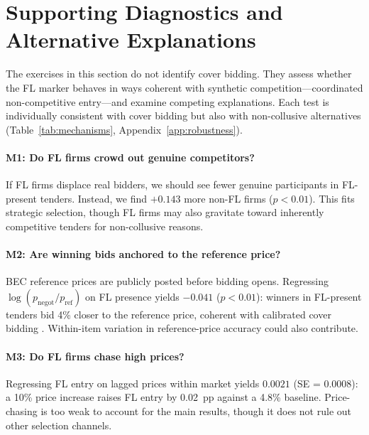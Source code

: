 \section{Supporting Diagnostics and Alternative Explanations}
\label{sec:mechanisms}

The exercises in this section do not identify cover bidding. They
assess whether the FL marker behaves in ways coherent with synthetic
competition---coordinated non-competitive entry---and examine
competing explanations. Each test is
individually consistent with cover bidding but also with
non-collusive alternatives (Table~\ref{tab:mechanisms},
Appendix~\ref{app:robustness}).

\paragraph{M1: Do FL firms crowd out genuine competitors?}
If FL firms displace real bidders, we should see fewer genuine
participants in FL-present tenders. Instead, we find $+0.143$ more
non-FL firms ($p < 0.01$). This fits strategic selection, though FL
firms may also gravitate toward inherently competitive tenders for
non-collusive reasons.

\paragraph{M2: Are winning bids anchored to the reference price?}
BEC reference prices are publicly posted before bidding opens.
Regressing $\log(p_{\text{negot}} / p_{\text{ref}})$ on FL presence
yields $-0.041$ ($p < 0.01$): winners in FL-present tenders bid 4\%
closer to the reference price, coherent with calibrated cover
bidding \citep{marshall2012economics}. Within-item variation in
reference-price accuracy could also contribute.

\paragraph{M3: Do FL firms chase high prices?}
Regressing FL entry on lagged prices within market yields $0.0021$
(SE = 0.0008): a 10\% price increase raises FL entry by 0.02~pp
against a 4.8\% baseline. Price-chasing is too weak to account for
the main results, though it does not rule out other selection
channels.

